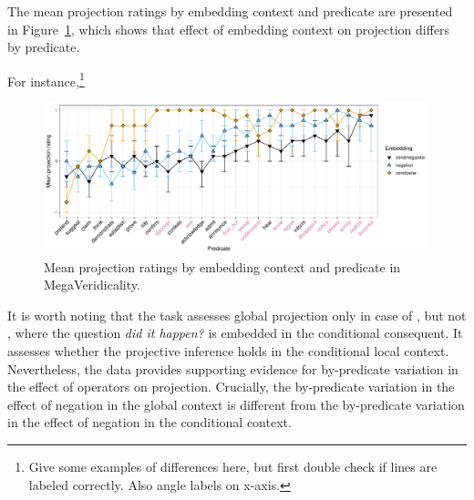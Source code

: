 \documentclass[a4paper,12pt,twoside]{article}
\begin{document}

	The mean projection ratings by embedding context and predicate are presented in Figure~\ref{fig:megaverid}, which shows that effect of embedding context on projection differs by predicate.

	For instance,\footnote{Give some examples of differences here, but first double check if lines are labeled correctly. Also angle labels on x-axis.}


			\begin{figure}[ht]
				\centering
				\includegraphics[width = \linewidth]{megaveridicality}
				\caption{Mean projection ratings by embedding context and predicate in MegaVeridicality.}
				\label{fig:megaverid}
			\end{figure}

	It is worth noting that the task assesses global projection only in case of \Last[a], but not \Last[b+c], where the question \textit{did it happen?} is embedded in the conditional consequent. It assesses whether the projective inference holds in the conditional local context. Nevertheless, the data provides supporting evidence for by-predicate variation in the effect of operators on projection. Crucially, the by-predicate variation in the effect of negation in the global context is different from the by-predicate variation in the effect of negation in the conditional context.
\end{document}
